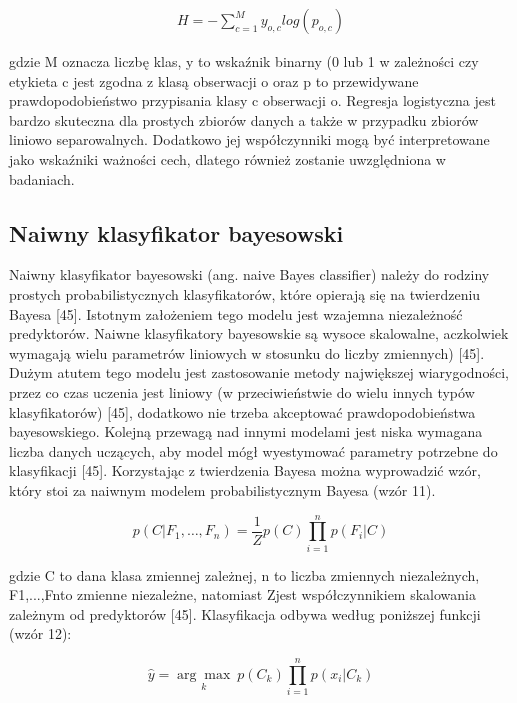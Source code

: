 \begin{align*}
H=-\sum_{c=1}^{M}y_{o,c}log(p_{o,c})
\end{align*}

gdzie M oznacza liczbę klas, y to wskaźnik binarny (0 lub 1 w zależności czy etykieta c jest zgodna z klasą obserwacji o oraz p to przewidywane prawdopodobieństwo przypisania klasy c obserwacji o.
    Regresja logistyczna jest bardzo skuteczna dla prostych zbiorów danych a także w przypadku zbiorów liniowo separowalnych. Dodatkowo jej współczynniki mogą być interpretowane jako wskaźniki ważności cech, dlatego również zostanie uwzględniona w badaniach.


\subsection{Naiwny klasyfikator bayesowski}
\label{cha:Naiwny klasyfikator bayesowski}

Naiwny klasyfikator bayesowski (ang. naive Bayes classifier) należy do rodziny prostych probabilistycznych klasyfikatorów, które opierają się na twierdzeniu Bayesa [45]. Istotnym założeniem tego modelu jest wzajemna niezależność predyktorów. Naiwne klasyfikatory bayesowskie są wysoce skalowalne, aczkolwiek wymagają wielu parametrów liniowych w stosunku do liczby zmiennych) [45]. Dużym atutem tego modelu jest zastosowanie metody największej wiarygodności, przez co czas uczenia jest liniowy (w przeciwieństwie do wielu innych typów klasyfikatorów) [45], dodatkowo nie trzeba akceptować prawdopodobieństwa bayesowskiego. Kolejną przewagą nad innymi modelami jest niska wymagana liczba danych uczących, aby model mógł wyestymować parametry potrzebne do klasyfikacji [45]. Korzystając z twierdzenia Bayesa można wyprowadzić wzór, który stoi za naiwnym modelem probabilistycznym Bayesa (wzór 11).

\begin{equation}
p(C|F_1,\dots,F_n)=\frac 1 Zp(C)\prod_{i=1}^{n}p(F_i|C)
\end{equation}

gdzie C to dana klasa zmiennej zależnej, n to liczba zmiennych niezależnych, F1,...,Fnto zmienne niezależne, natomiast Zjest współczynnikiem skalowania zależnym od predyktorów [45]. Klasyfikacja odbywa według poniższej funkcji (wzór 12):

\begin{equation}
\hat y=\underset{k}{\arg\max}\ p(C_k)\prod_{i=1}^{n}p(x_i|C_k)
\end{equation}

